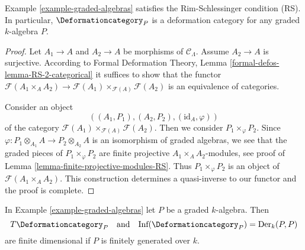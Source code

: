 \begin{lemma}
\label{lemma-graded-algebras-RS}
Example \ref{example-graded-algebras}
satisfies the Rim-Schlessinger condition (RS).
In particular, $\Deformationcategory_P$ is a deformation category
for any graded $k$-algebra $P$.
\end{lemma}

\begin{proof}
Let $A_1 \to A$ and $A_2 \to A$ be morphisms of $\mathcal{C}_\Lambda$.
Assume $A_2 \to A$ is surjective. According to
Formal Deformation Theory, Lemma
\ref{formal-defos-lemma-RS-2-categorical}
it suffices to show that the functor
$\mathcal{F}(A_1 \times_A A_2) \to
\mathcal{F}(A_1) \times_{\mathcal{F}(A)} \mathcal{F}(A_2)$
is an equivalence of categories.

\medskip\noindent
Consider an object
$$
((A_1, P_1), (A_2, P_2), (\text{id}_A, \varphi))
$$
of the category $\mathcal{F}(A_1) \times_{\mathcal{F}(A)} \mathcal{F}(A_2)$.
Then we consider $P_1 \times_\varphi P_2$. Since
$\varphi : P_1 \otimes_{A_1} A \to P_2 \otimes_{A_2} A$
is an isomorphism of graded algebras, we see that the graded pieces
of $P_1 \times_\varphi P_2$ are finite projective $A_1 \times_A A_2$-modules,
see proof of Lemma \ref{lemma-finite-projective-modules-RS}.
Thus $P_1 \times_\varphi P_2$ is an object of $\mathcal{F}(A_1 \times_A A_2)$.
This construction determines a quasi-inverse to our functor
and the proof is complete.
\end{proof}

\begin{lemma}
\label{lemma-graded-algebras-TI}
In Example \ref{example-graded-algebras} let $P$ be a graded $k$-algebra.
Then
$$
T\Deformationcategory_P
\quad\text{and}\quad
\text{Inf}(\Deformationcategory_P) = \text{Der}_k(P, P)
$$
are finite dimensional if $P$ is finitely generated over $k$.
\end{lemma}

